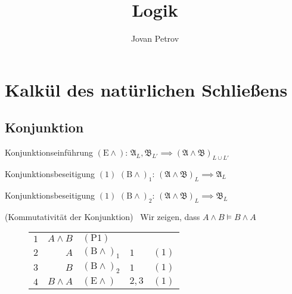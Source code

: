 \documentclass[11pt, a4paper]{article}
\begin{document}
\setlength{\headheight}{14pt}

\title{Logik}
\author{Jovan Petrov}
\maketitle

\pagestyle{fancy}

\renewcommand{\AA}{\mathfrak{A}}
\newcommand{\BB}{\mathfrak{B}}
\newcommand{\CC}{\mathfrak{C}}

\newcommand{\Bund}{(\text{B}\land)}
\newcommand{\Boder}{(\text{B}\lor)}
\newcommand{\Bsub}{(\text{B}\rightarrow)}

\newcommand{\Eund}{(\text{E}\land)}
\newcommand{\Eoder}{(\text{E}\lor)}
\newcommand{\Esub}{(\text{E}\rightarrow)}

\newcommand{\Prae}[1]{(\text{P}#1)}
\newcommand{\An}[1]{(\text{A}#1)}


\section{Kalkül des natürlichen Schließens}

\subsection{Konjunktion}

\begin{regel}{Konjunktionseinführung}{}
	$\Eund$: $\AA_L, \BB_{L'} \implies (\AA \land \BB)_{L \cup L'}$		
\end{regel}

\begin{regel}{Konjunktionsbeseitigung $(1)$}{}
	$\Bund_1$: $(\AA \land \BB)_{L} \implies \AA_L$		
\end{regel}

\begin{regel}{Konjunktionsbeseitigung $(1)$}{}
	$\Bund_2$: $(\AA \land \BB)_{L} \implies \BB_L$		
\end{regel}

\begin{bsp}(Kommutativität der Konjunktion) \ 
	Wir zeigen, dass $A \land B \models B \land A$
	\begin{figure}[h]
	\centering
	
	
	\begin{tabular}{l r | l l l}
		$1$ & $A \land B$ &  $\Prae{1}$ & &\\
		$2$ & $A$ &  $\Bund_1$ & $1$ & $(1)$\\
		$3$ & $B$ &  $\Bund_2$ & $1$ & $(1)$\\
		$4$ & $B \land A$ &  $\Eund$ & $2,3$ & $(1)$\\
	\end{tabular}

	\end{figure}

\end{bsp}
\end{document}

